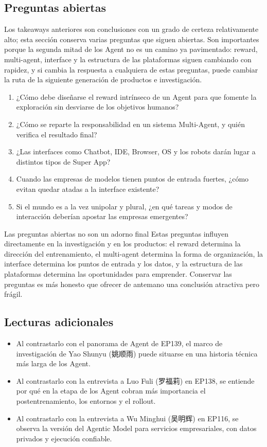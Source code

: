 \documentclass[a4paper]{article}
\begin{document}
\subsection{Preguntas abiertas}

Los takeaways anteriores son conclusiones con un grado de certeza relativamente alto; esta sección conserva varias preguntas que siguen abiertas. Son importantes porque la segunda mitad de los Agent no es un camino ya pavimentado: reward, multi-agent, interface y la estructura de las plataformas siguen cambiando con rapidez, y si cambia la respuesta a cualquiera de estas preguntas, puede cambiar la ruta de la siguiente generación de productos e investigación.

\begin{enumerate}
\item ¿Cómo debe diseñarse el reward intrínseco de un Agent para que fomente la exploración sin desviarse de los objetivos humanos?
\item ¿Cómo se reparte la responsabilidad en un sistema Multi-Agent, y quién verifica el resultado final?
\item ¿Las interfaces como Chatbot, IDE, Browser, OS y los robots darán lugar a distintos tipos de Super App?
\item Cuando las empresas de modelos tienen puntos de entrada fuertes, ¿cómo evitan quedar atadas a la interface existente?
\item Si el mundo es a la vez unipolar y plural, ¿en qué tareas y modos de interacción deberían apostar las empresas emergentes?
\end{enumerate}

\begin{warningbox}{Las preguntas abiertas no son un adorno final}
Estas preguntas influyen directamente en la investigación y en los productos: el reward determina la dirección del entrenamiento, el multi-agent determina la forma de organización, la interface determina los puntos de entrada y los datos, y la estructura de las plataformas determina las oportunidades para emprender. Conservar las preguntas es más honesto que ofrecer de antemano una conclusión atractiva pero frágil.
\end{warningbox}

\subsection{Lecturas adicionales}

\begin{itemize}
\item Al contrastarlo con el panorama de Agent de EP139, el marco de investigación de Yao Shunyu (姚顺雨) puede situarse en una historia técnica más larga de los Agent.
\item Al contrastarlo con la entrevista a Luo Fuli (罗福莉) en EP138, se entiende por qué en la etapa de los Agent cobran más importancia el postentrenamiento, los entornos y el rollout.
\item Al contrastarlo con la entrevista a Wu Minghui (吴明辉) en EP116, se observa la versión del Agentic Model para servicios empresariales, con datos privados y ejecución confiable.
\end{itemize}
\end{document}

